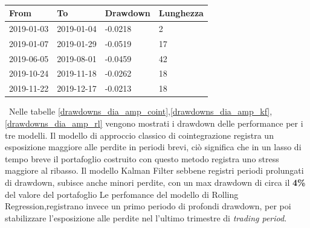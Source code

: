 \documentclass[]{article}
\begin{document}
\
\\
\begin{center}
	\begin{tabular}{@{}llll@{}}
		\toprule
		From       & To         & Drawdown   & Lunghezza \\ \midrule
		2019-01-03 & 2019-01-04 & -0.0218 & 2      \\
		\rowcolor[HTML]{FFCCC9} 
		2019-01-07 & 2019-01-29 & -0.0519 & 17     \\
		2019-06-05 & 2019-08-01 & -0.0459 & 42     \\
		2019-10-24 & 2019-11-18 & -0.0262 & 18     \\
		2019-11-22 & 2019-12-17 & -0.0213 & 18     \\ \bottomrule
	\end{tabular}
	\label{drawdowns_dia_amp_rl}
\end{center}
\
Nelle tabelle \ref{drawdowns_dia_amp_coint},\ref{drawdowns_dia_amp_kf},\ref{drawdowns_dia_amp_rl} vengono mostrati i drawdown delle performance per i tre modelli.
Il modello di approccio classico di cointegrazione registra un esposizione maggiore alle perdite in periodi brevi, ciò significa che in un lasso di tempo breve il portafoglio costruito con questo metodo registra uno stress maggiore al ribasso.
Il modello Kalman Filter sebbene registri periodi prolungati di drawdown, subisce anche minori perdite, con un max drawdown di circa  il \textbf{4\%} del valore del portafoglio
Le perfomance del modello di Rolling Regression,registrano invece un primo periodo di profondi drawdown, per poi stabilizzare l'esposizione alle perdite nel l'ultimo trimestre di \textit{trading period}.
\end{document}
